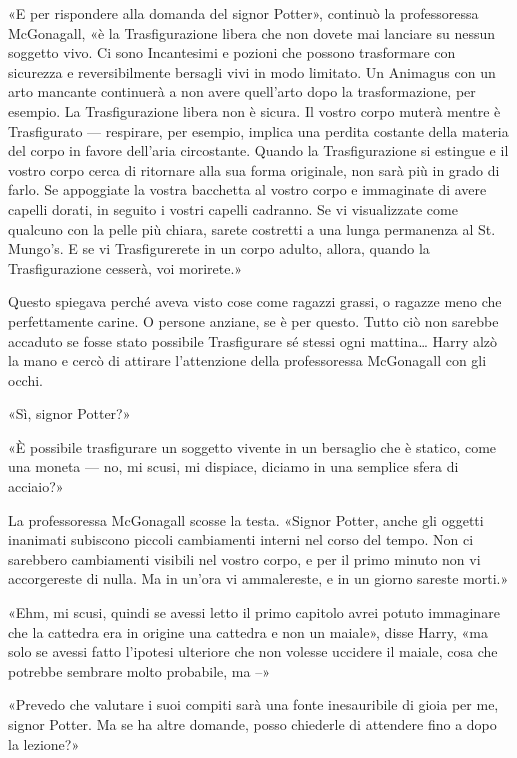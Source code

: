 «E per rispondere alla domanda del signor Potter», continuò la professoressa McGonagall, «è la Trasfigurazione libera che non dovete mai lanciare su nessun soggetto vivo. Ci sono Incantesimi e pozioni che possono trasformare con sicurezza e reversibilmente bersagli vivi in modo limitato. Un Animagus con un arto mancante continuerà a non avere quell’arto dopo la trasformazione, per esempio. La Trasfigurazione libera non è sicura. Il vostro corpo muterà mentre è Trasfigurato — respirare, per esempio, implica una perdita costante della materia del corpo in favore dell’aria circostante. Quando la Trasfigurazione si estingue e il vostro corpo cerca di ritornare alla sua forma originale, non sarà più in grado di farlo. Se appoggiate la vostra bacchetta al vostro corpo e immaginate di avere capelli dorati, in seguito i vostri capelli cadranno. Se vi visualizzate come qualcuno con la pelle più chiara, sarete costretti a una lunga permanenza al St. Mungo’s. E se vi Trasfigurerete in un corpo adulto, allora, quando la Trasfigurazione cesserà, voi morirete.»

Questo spiegava perché aveva visto cose come ragazzi grassi, o ragazze meno che perfettamente carine. O persone anziane, se è per questo. Tutto ciò non sarebbe accaduto se fosse stato possibile Trasfigurare sé stessi ogni mattina… Harry alzò la mano e cercò di attirare l’attenzione della professoressa McGonagall con gli occhi.

«Sì, signor Potter?»

«È possibile trasfigurare un soggetto vivente in un bersaglio che è statico, come una moneta — no, mi scusi, mi dispiace, diciamo in una semplice sfera di acciaio?»

La professoressa McGonagall scosse la testa. «Signor Potter, anche gli oggetti inanimati subiscono piccoli cambiamenti interni nel corso del tempo. Non ci sarebbero cambiamenti visibili nel vostro corpo, e per il primo minuto non vi accorgereste di nulla. Ma in un’ora vi ammalereste, e in un giorno sareste morti.»

«Ehm, mi scusi, quindi se avessi letto il primo capitolo avrei potuto immaginare che la cattedra era in origine una cattedra e non un maiale», disse Harry, «ma solo se avessi fatto l’ipotesi ulteriore che non volesse uccidere il maiale, cosa che potrebbe sembrare molto probabile, ma –»

«Prevedo che valutare i suoi compiti sarà una fonte inesauribile di gioia per me, signor Potter. Ma se ha altre domande, posso chiederle di attendere fino a dopo la lezione?»

